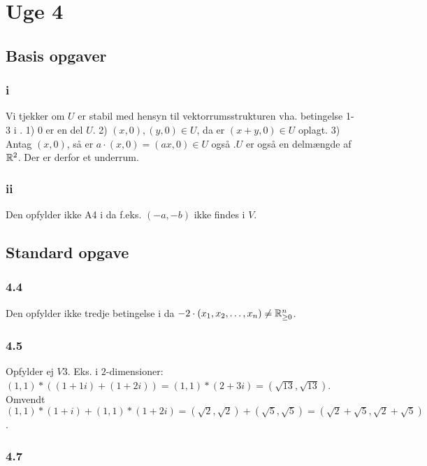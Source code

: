 
\chapter{Uge 4}

	\section{Basis opgaver}

		\subsection{i}

			Vi tjekker om $U$ er stabil med hensyn til vektorrumsstrukturen vha. betingelse 1-3 i \cite[Definition 4.1.4]{hesselholt2017}. 1) $0$ er en del $U$. 2) $(x,0),(y,0)\in U$, da er $(x+y,0)\in U$ oplagt. 3) Antag $(x,0)$, så er $a\cdot (x,0)=(ax,0)\in U$ også .$U$ er også en delmængde af $\mathbb{R}^2$. Der er derfor et underrum.

		\subsection{ii}

			Den opfylder ikke A4 i \cite[Definition 4.1.4]{hesselholt2017} da f.eks. $(-a,-b)$ ikke findes i $V$.

	\section{Standard opgave}

		\subsection{4.4}

			Den opfylder ikke tredje betingelse i \cite[Definition 4.1.4]{hesselholt2017} da $-2\cdot (x_1,x_2,\ldots,x_n)\neq \mathbb{R}^n_{\geq 0}$.

		\subsection{4.5}

			Opfylder ej $V3$. Eks. i $2$-dimensioner: $(1,1)*((1+1i)+(1+2i))=(1,1)*(2+3i)=(\sqrt{13},\sqrt{13})$. Omvendt $(1,1)*(1+i)+(1,1)*(1+2i)=(\sqrt{2},\sqrt{2})+(\sqrt{5},\sqrt{5})=(\sqrt{2}+\sqrt{5},\sqrt{2}+\sqrt{5})$.

		\subsection{4.7}

